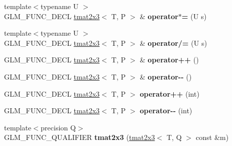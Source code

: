 \begin{DoxyCompactItemize}
\item 
\hypertarget{structglm_1_1detail_1_1tmat2x3_aa37d03f6278f001ac2ece38115148bdd}{{\footnotesize template$<$typename U $>$ }\\G\-L\-M\-\_\-\-F\-U\-N\-C\-\_\-\-D\-E\-C\-L \hyperlink{structglm_1_1detail_1_1tmat2x3}{tmat2x3}$<$ T, P $>$ \& {\bfseries operator$\ast$=} (U s)}\label{structglm_1_1detail_1_1tmat2x3_aa37d03f6278f001ac2ece38115148bdd}

\item 
\hypertarget{structglm_1_1detail_1_1tmat2x3_a3687e511d47d156bb7546102d28fa2f7}{{\footnotesize template$<$typename U $>$ }\\G\-L\-M\-\_\-\-F\-U\-N\-C\-\_\-\-D\-E\-C\-L \hyperlink{structglm_1_1detail_1_1tmat2x3}{tmat2x3}$<$ T, P $>$ \& {\bfseries operator/=} (U s)}\label{structglm_1_1detail_1_1tmat2x3_a3687e511d47d156bb7546102d28fa2f7}

\item 
\hypertarget{structglm_1_1detail_1_1tmat2x3_a633e1c5afab2a44f0692e5c71fbba424}{G\-L\-M\-\_\-\-F\-U\-N\-C\-\_\-\-D\-E\-C\-L \hyperlink{structglm_1_1detail_1_1tmat2x3}{tmat2x3}$<$ T, P $>$ \& {\bfseries operator++} ()}\label{structglm_1_1detail_1_1tmat2x3_a633e1c5afab2a44f0692e5c71fbba424}

\item 
\hypertarget{structglm_1_1detail_1_1tmat2x3_a794f237071edb867947ac54de6fa9545}{G\-L\-M\-\_\-\-F\-U\-N\-C\-\_\-\-D\-E\-C\-L \hyperlink{structglm_1_1detail_1_1tmat2x3}{tmat2x3}$<$ T, P $>$ \& {\bfseries operator-\/-\/} ()}\label{structglm_1_1detail_1_1tmat2x3_a794f237071edb867947ac54de6fa9545}

\item 
\hypertarget{structglm_1_1detail_1_1tmat2x3_a36ac4254a3ce5982afcf1330a675a973}{G\-L\-M\-\_\-\-F\-U\-N\-C\-\_\-\-D\-E\-C\-L \hyperlink{structglm_1_1detail_1_1tmat2x3}{tmat2x3}$<$ T, P $>$ {\bfseries operator++} (int)}\label{structglm_1_1detail_1_1tmat2x3_a36ac4254a3ce5982afcf1330a675a973}

\item 
\hypertarget{structglm_1_1detail_1_1tmat2x3_abbbbcd9db53e635fc2537666fe766b03}{G\-L\-M\-\_\-\-F\-U\-N\-C\-\_\-\-D\-E\-C\-L \hyperlink{structglm_1_1detail_1_1tmat2x3}{tmat2x3}$<$ T, P $>$ {\bfseries operator-\/-\/} (int)}\label{structglm_1_1detail_1_1tmat2x3_abbbbcd9db53e635fc2537666fe766b03}

\item 
\hypertarget{structglm_1_1detail_1_1tmat2x3_ad87db0132efbb006cabcb3a833c516ba}{{\footnotesize template$<$precision Q$>$ }\\G\-L\-M\-\_\-\-F\-U\-N\-C\-\_\-\-Q\-U\-A\-L\-I\-F\-I\-E\-R {\bfseries tmat2x3} (\hyperlink{structglm_1_1detail_1_1tmat2x3}{tmat2x3}$<$ T, Q $>$ const \&m)}\label{structglm_1_1detail_1_1tmat2x3_ad87db0132efbb006cabcb3a833c516ba}


\end{DoxyCompactItemize}
